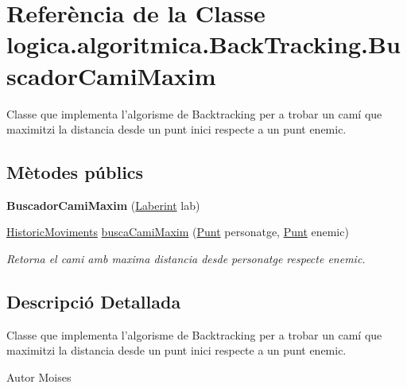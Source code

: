\hypertarget{classlogica_1_1algoritmica_1_1_back_tracking_1_1_buscador_cami_maxim}{\section{Referència de la Classe logica.\+algoritmica.\+Back\+Tracking.\+Buscador\+Cami\+Maxim}
\label{classlogica_1_1algoritmica_1_1_back_tracking_1_1_buscador_cami_maxim}
}


Classe que implementa l'algorisme de Backtracking per a trobar un camí que maximitzi la distancia desde un punt inici respecte a un punt enemic.  


\subsection*{Mètodes públics}
\begin{DoxyCompactItemize}
\item 
\hypertarget{classlogica_1_1algoritmica_1_1_back_tracking_1_1_buscador_cami_maxim_a67aadbdebeeb60a4b5aab24c9a2e42e9}{{\bfseries Buscador\+Cami\+Maxim} (\hyperlink{classlogica_1_1laberints_1_1_laberint}{Laberint} lab)}\label{classlogica_1_1algoritmica_1_1_back_tracking_1_1_buscador_cami_maxim_a67aadbdebeeb60a4b5aab24c9a2e42e9}

\item 
\hyperlink{classlogica_1_1historic__moviments_1_1_historic_moviments}{Historic\+Moviments} \hyperlink{classlogica_1_1algoritmica_1_1_back_tracking_1_1_buscador_cami_maxim_afbd9364d6bdb5233798dde0d34090eec}{busca\+Cami\+Maxim} (\hyperlink{classlogica_1_1_punt}{Punt} personatge, \hyperlink{classlogica_1_1_punt}{Punt} enemic)
\begin{DoxyCompactList}\small\item\em Retorna el cami amb maxima distancia desde personatge respecte enemic. \end{DoxyCompactList}\end{DoxyCompactItemize}


\subsection{Descripció Detallada}
Classe que implementa l'algorisme de Backtracking per a trobar un camí que maximitzi la distancia desde un punt inici respecte a un punt enemic. 

\begin{DoxyAuthor}{Autor}
Moises 
\end{DoxyAuthor}



